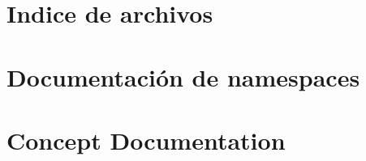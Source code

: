 \documentclass[twoside]{book}
\newcommand{\+}{\discretionary{\mbox{\scriptsize$\hookleftarrow$}}{}{}}
\begin{document}
\chapter{Indice de archivos}

\chapter{Documentación de namespaces}









\chapter{Concept Documentation}



\end{document}
